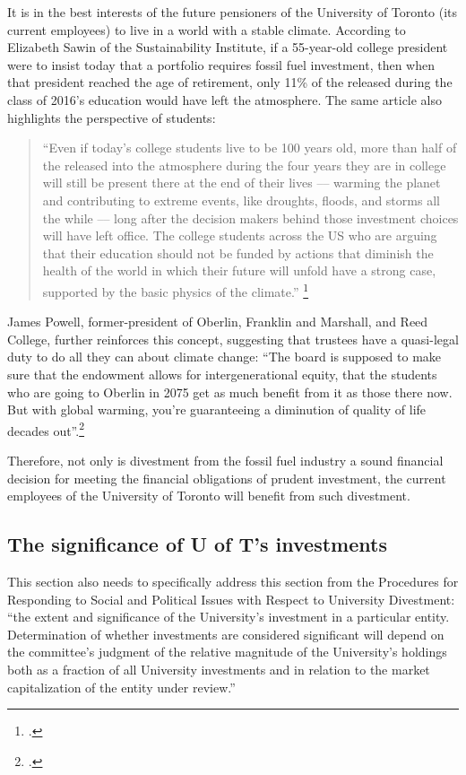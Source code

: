 It is in the best interests of the future pensioners of the University of Toronto (its current employees) to live in a world with a stable climate.
According to Elizabeth Sawin of the Sustainability Institute, if a 55-year-old college president were to insist today that a portfolio requires fossil fuel investment, then when that president reached the age of retirement, only 11\% of the  released during the class of 2016's education would have left the atmosphere.
The same article also highlights the perspective of students: 
\begin{quote} ``Even if today's college students live to be 100 years old, more than half of the  released into the atmosphere during the four years they are in college will still be present there at the end of their lives –-- warming the planet and contributing to extreme events, like droughts, floods, and storms all the while –-- long after the decision makers behind those investment choices will have left office. The college students across the US who are arguing that their education should not be funded by actions that diminish the health of the world in which their future will unfold have a strong case, supported by the basic physics of the climate.'' \footcite{ClimateInteractivePersist}
\end{quote}
James Powell, former-president of Oberlin, Franklin and Marshall, and Reed College, further reinforces this concept, suggesting that trustees have a quasi-legal duty to do all they can about climate change: ``The board is supposed to make sure that the endowment allows for intergenerational equity, that the students who are going to Oberlin in 2075 get as much benefit from it as those there now. But with global warming, you're guaranteeing a diminution of quality of life decades out''.\footcite{CaseForDivestment}



Therefore, not only is divestment from the fossil fuel industry a sound financial decision for meeting the financial obligations of prudent investment, the current employees of the University of Toronto will benefit from such divestment.



		\subsection{The significance of U of T's investments}



\begin{vcom}
This section also needs to specifically address this section from the Procedures for Responding to Social and Political Issues with Respect to University Divestment: ``the extent and significance of the University's investment in a particular entity.  Determination of whether investments are considered significant will depend on the committee's judgment of the relative magnitude of the University's holdings both as a fraction of all University investments and in relation to the market capitalization of the entity under review.''
\end{vcom}



